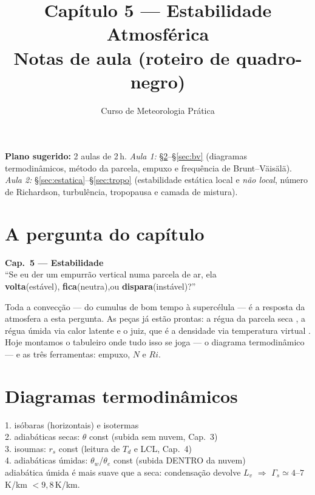 \documentclass[11pt]{article}
\title{Capítulo 5 --- Estabilidade Atmosférica\\
{\large Notas de aula (roteiro de quadro-negro)}}
\author{Curso de Meteorologia Prática}
\date{}
\begin{document}
\maketitle
\thispagestyle{fancy}

\noindent\textbf{Plano sugerido:} 2 aulas de 2\,h.
\emph{Aula 1:} \S\ref{sec:diagramas}--\S\ref{sec:bv} (diagramas
termodinâmicos, método da parcela, empuxo e frequência de Brunt--Väisälä).
\emph{Aula 2:} \S\ref{sec:estatica}--\S\ref{sec:tropo} (estabilidade
estática local e \emph{não local}, número de Richardson, turbulência,
tropopausa e camada de mistura).

\section{A pergunta do capítulo}

\begin{noquadro}[abertura]
\textbf{Cap.~5 --- Estabilidade}\\[2pt]
``Se eu der um empurrão vertical numa parcela de ar, ela\\
\hspace*{2em}\textbf{volta}\quad(estável),\qquad
\textbf{fica}\quad(neutra),\qquad ou
\textbf{dispara}\quad(instável)?''
\end{noquadro}

Toda a convecção — do cumulus de bom tempo à supercélula
 — é a resposta da atmosfera a esta pergunta.
As peças já estão prontas: a régua da parcela seca
, a régua úmida via calor latente
 e o juiz, que é a densidade via
temperatura virtual . Hoje montamos o
tabuleiro onde tudo isso se joga — o diagrama termodinâmico — e as três
ferramentas: empuxo, $N$ e $Ri$.

\section{Diagramas termodinâmicos}\label{sec:diagramas}


\begin{noquadro}
1. isóbaras (horizontais) e isotermas\\
2. adiabáticas secas: $\theta$ const \hfill (subida sem nuvem, Cap.~3)\\
3. isoumas: $r_s$ const \hfill (leitura de $T_d$ e LCL, Cap.~4)\\
4. adiabáticas úmidas: $\theta_w$/$\theta_e$ const \hfill (subida DENTRO
da nuvem)\\[2pt]
adiabática úmida é mais suave que a seca: condensação devolve $L_v$
$\Rightarrow$ $\Gamma_s \simeq 4$--$7$\,K/km $< 9{,}8$\,K/km.
\end{noquadro}
\end{document}

